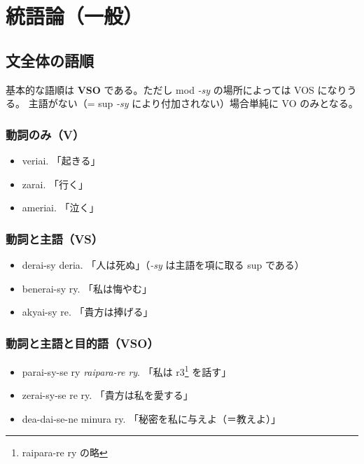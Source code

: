 \chapter{統語論（一般）}

\section{文全体の語順}

基本的な語順は \textbf{VSO} である。ただし mod \emph{-sy} の場所によっては VOS になりうる。
主語がない（= sup \emph{-sy} により付加されない）場合単純に VO のみとなる。

\subsection{動詞のみ（V）}

\begin{itemize}
    \item veriai.   「起きる」
    \item zarai.    「行く」
    \item ameriai.  「泣く」
\end{itemize}

\subsection{動詞と主語（VS）}
\begin{itemize}
    \item derai-sy deria.   「人は死ぬ」（\emph{-sy} は主語を項に取る sup である）
    \item benerai-sy ry.    「私は悔やむ」
    \item akyai-sy re.      「貴方は捧げる」
\end{itemize}

\subsection{動詞と主語と目的語（VSO）}

\begin{itemize}
    \item parai-sy-se ry \emph{raipara-re ry}. 「私は r3\footnote{raipara-re ry の略} を話す」
    \item zerai-sy-se re ry. 「貴方は私を愛する」
    \item dea-dai-se-ne minura ry. 「秘密を私に与えよ（＝教えよ）」
\end{itemize}

